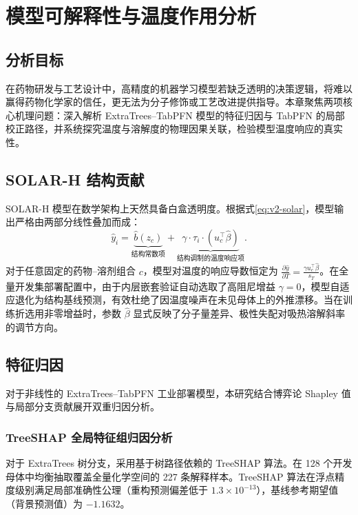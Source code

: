 \section{模型可解释性与温度作用分析}

\subsection{分析目标}

在药物研发与工艺设计中，高精度的机器学习模型若缺乏透明的决策逻辑，将难以赢得药物化学家的信任，更无法为分子修饰或工艺改进提供指导。本章聚焦两项核心机理问题：深入解析 ExtraTrees--TabPFN 模型的特征归因与 TabPFN 的局部校正路径，并系统探究温度与溶解度的物理因果关联，检验模型温度响应的真实性。

\subsection{SOLAR-H 结构贡献}

SOLAR-H 模型在数学架构上天然具备白盒透明度。根据式\eqref{eq:v2-solar}，模型输出严格由两部分线性叠加而成：
\begin{equation}
\widehat y_i = \underbrace{\widehat b(z_c)}_{\text{结构常数项}} + \underbrace{\gamma \cdot \tau_i \cdot \left( u_c^\top \widehat\beta \right)}_{\text{结构调制的温度响应项}}.
\end{equation}
对于任意固定的药物--溶剂组合 $c$，模型对温度的响应导数恒定为 $\frac{\partial \widehat y}{\partial T} = \frac{\gamma u_c^\top \widehat\beta}{s_T}$。在全量开发集部署配置中，由于内层嵌套验证自动选取了高阻尼增益 $\gamma = 0$，模型自适应退化为结构基线预测，有效杜绝了因温度噪声在未见母体上的外推漂移。当在训练折选用非零增益时，参数 $\widehat\beta$ 显式反映了分子量差异、极性失配对吸热溶解斜率的调节方向。

\subsection{特征归因}\label{sec:deployment-explanations}

对于非线性的 ExtraTrees--TabPFN 工业部署模型，本研究结合博弈论 Shapley 值与局部分支贡献展开双重归因分析。

\subsubsection{TreeSHAP 全局特征组归因分析}
对于 ExtraTrees 树分支，采用基于树路径依赖的 TreeSHAP 算法\cite{treeshap2020}。在 128 个开发母体中均衡抽取覆盖全量化学空间的 227 条解释样本。TreeSHAP 算法在浮点精度级别满足局部准确性公理（重构预测偏差低于 $1.3\times10^{-13}$），基线参考期望值（背景预测值）为 $-1.1632$。

